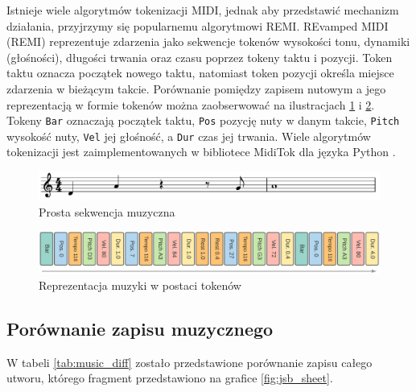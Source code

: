 \documentclass[data-science]{agh-wi} %
\begin{document}
Istnieje wiele algorytmów tokenizacji MIDI, jednak aby przedstawić mechanizm działania, przyjrzymy się popularnemu algorytmowi REMI. REvamped MIDI (REMI) reprezentuje zdarzenia jako sekwencje tokenów wysokości tonu, dynamiki (głośności), długości trwania oraz czasu poprzez tokeny taktu i pozycji. Token taktu oznacza początek nowego taktu, natomiast token pozycji określa miejsce zdarzenia w bieżącym takcie. Porównanie pomiędzy zapisem nutowym a jego reprezentacją w formie tokenów można zaobserwować na ilustracjach \ref*{fig:remi_notes} i \ref*{fig:remi_tokens}. Tokeny \texttt{Bar} oznaczają początek taktu, \texttt{Pos} pozycję nuty w danym takcie, \texttt{Pitch} wysokość nuty, \texttt{Vel} jej głośność, a \texttt{Dur} czas jej trwania. Wiele algorytmów tokenizacji jest zaimplementowanych w bibliotece MidiTok dla języka Python \cite{miditok2021}.

\begin{figure}
    \begin{center}
        \includegraphics[width=0.9\linewidth]{./img/tokenizer_notes.pdf}
    \end{center}
    \caption{Prosta sekwencja muzyczna}\label{fig:remi_notes}
\end{figure}

\begin{figure}
    \begin{center}
        \includegraphics[width=0.9\linewidth]{./img/remi.png}
    \end{center}
    \caption{Reprezentacja muzyki w postaci tokenów}\label{fig:remi_tokens}
\end{figure}

\subsection{Porównanie zapisu muzycznego}
W tabeli \ref*{tab:music_diff} zostało przedstawione porównanie zapisu całego utworu, którego fragment przedstawiono na grafice \ref*{fig:jsb_sheet}.
\end{document}
